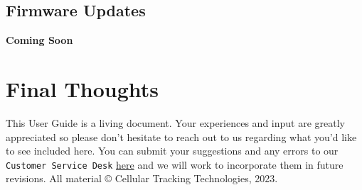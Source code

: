 \documentclass[
]{article}
\begin{document}
\hypertarget{firmware-updates}{%
\subsection{Firmware Updates}\label{firmware-updates}}

\textbf{Coming Soon}

\hypertarget{final-thoughts}{%
\section{Final Thoughts}\label{final-thoughts}}

This User Guide is a living document. Your experiences and input are
greatly appreciated so please don't hesitate to reach out to us
regarding what you'd like to see included here. You can submit your
suggestions and any errors to our \texttt{Customer\ Service\ Desk}
\href{https://celltracktech.com/pages/customer-service-desk-csd}{here}
and we will work to incorporate them in future revisions. All material ©
Cellular Tracking Technologies, 2023.

\newpage
\end{document}
